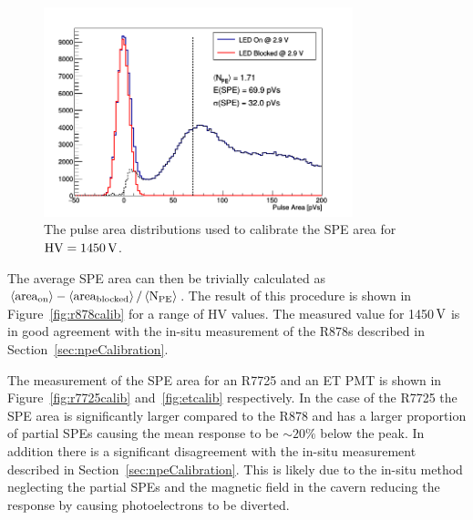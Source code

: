 \documentclass[12pt]{article}
\newcommand{\unit}[1]{\ensuremath{\text{\,#1}}\xspace}
\newcommand{\npe} {\mbox{\ensuremath{\textrm{N}_\textrm{PE}}}\xspace}
\begin{document}
\begin{figure}[ht!]
    \centering
    \includegraphics[width=0.8\textwidth]{figures/speCalib}
    \caption{\label{fig:SPEcalib} The pulse area distributions used to calibrate the SPE area for
    $\text{HV}=1450\unit{V}$.}
\end{figure}

The average SPE area can then be trivially calculated as 
$\left<\text{area}_\text{on}\right>-\left<\text{area}_\text{blocked}\right>/\left<\npe\right>$.
The result of this procedure is shown in Figure~\ref{fig:r878calib} for a range of HV values. 
The measured value for 1450\unit{V} is in good agreement with the 
in-situ measurement of the R878s described in Section~\ref{sec:npeCalibration}.

The measurement of the SPE area for an R7725 and an ET PMT 
is shown in Figure~\ref{fig:r7725calib} and~\ref{fig:etcalib} respectively.
In the case of the R7725 the SPE area is significantly larger compared to the R878 and
has a larger proportion of partial SPEs causing the mean response to be $\sim 20\%$ below the peak.
In addition there is a significant disagreement with the in-situ measurement described 
in Section~\ref{sec:npeCalibration}. This is likely due to the in-situ method 
neglecting the partial SPEs and the magnetic field in the cavern reducing the response 
by causing photoelectrons to be diverted.
\end{document}
